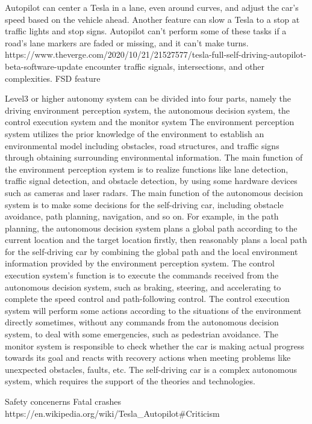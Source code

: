 Autopilot can center a Tesla in a lane, even around curves, and adjust the car’s speed based on the vehicle ahead.
Another feature can slow a Tesla to a stop at traffic lights and stop signs. 
Autopilot can’t perform some of these tasks if a road’s lane markers are faded or missing, and it can’t make turns.
https://www.theverge.com/2020/10/21/21527577/tesla-full-self-driving-autopilot-beta-software-update
encounter traffic signals, intersections, and other complexities.
FSD feature

Level3 or higher autonomy system
can be divided into four parts, namely the driving environment perception system, the autonomous
decision system, the control execution system and the monitor system
The environment perception system utilizes the prior knowledge of the environment to establish
an environmental model including obstacles, road structures, and traffic signs through obtaining
surrounding environmental information. The main function of the environment perception system is
to realize functions like lane detection, traffic signal detection, and obstacle detection, by using some
hardware devices such as cameras and laser radars.
The main function of the autonomous decision system is to make some decisions for the
self-driving car, including obstacle avoidance, path planning, navigation, and so on. For example,
in the path planning, the autonomous decision system plans a global path according to the current
location and the target location firstly, then reasonably plans a local path for the self-driving car
by combining the global path and the local environment information provided by the environment
perception system.
The control execution system’s function is to execute the commands received from the autonomous
decision system, such as braking, steering, and accelerating to complete the speed control and
path-following control. The control execution system will perform some actions according to the
situations of the environment directly sometimes, without any commands from the autonomous
decision system, to deal with some emergencies, such as pedestrian avoidance.
The monitor system is responsible to check whether the car is making actual progress towards its
goal and reacts with recovery actions when meeting problems like unexpected obstacles, faults, etc.
The self-driving car is a complex autonomous system, which requires the support of the
theories and technologies.

Safety concenerns
Fatal crashes
https://en.wikipedia.org/wiki/Tesla_Autopilot#Criticism
